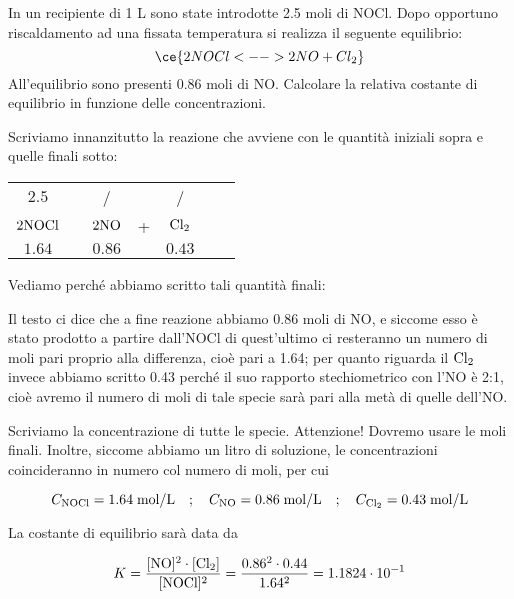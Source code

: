 \begin{esercizio}
    In un recipiente di 1 L sono state introdotte 2.5 moli di NOCl. Dopo opportuno riscaldamento ad una fissata temperatura si realizza il seguente equilibrio:
    \begin{equation*}
        \ce{2 NOCl <--> 2NO + Cl_2}
    \end{equation*}
    All'equilibrio sono presenti 0.86 moli di NO. Calcolare la relativa costante di equilibrio in funzione delle concentrazioni.
\end{esercizio}
\begin{soluzione}
    Scriviamo innanzitutto la reazione che avviene con le quantità iniziali sopra e quelle finali sotto: 

\begin{center}
    \begin{tabular}{ccccccc}
        $2.5$ & & / & & /\\
        $\rm 2NOCl$ & \ce{<-->} & $\rm 2NO$ & + & $\rm Cl_2$\\
        $1.64$ & & $0.86$ & & $0.43$\\
    \end{tabular}
\end{center}

Vediamo perché abbiamo scritto tali quantità finali:

Il testo ci dice che a fine reazione abbiamo 0.86 moli di NO, e siccome esso è stato prodotto a partire dall'NOCl di quest'ultimo ci resteranno un numero di moli pari proprio alla differenza, cioè pari a 1.64; per quanto riguarda il $\rm Cl_2$ invece abbiamo scritto 0.43 perché il suo rapporto stechiometrico con l'NO è 2:1, cioè avremo il numero di moli di tale specie sarà pari alla metà di quelle dell'NO.

Scriviamo la concentrazione di tutte le specie. Attenzione! Dovremo usare le moli finali. Inoltre, siccome abbiamo un litro di soluzione, le concentrazioni coincideranno in numero col numero di moli, per cui

$$C_{\rm NOCl}=1.64 \; \text{mol/L}
\quad;\quad
C_{\rm NO}=0.86 \; \text{mol/L}
\quad;\quad
C_{\rm Cl_2}=0.43 \; \text{mol/L}$$

La costante di equilibrio sarà data da

$$K=\rm \frac{[NO]^2 \cdot [Cl_2]}{[NOCl]^2}
=\frac{0.86^2 \cdot 0.44}{1.64^2}=1.1824 \cdot 10^{-1}$$
\end{soluzione}

\newpage

